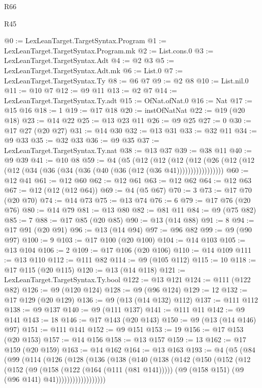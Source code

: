 \begin{lexlean}{R66}
\begin{lexlean}{R45}
\begin{coremodule}
{{{{{{{{{{{{{{{{{{{{{{{{{{{{{{{{{{{{{{{{{{{{{{{{{{{{{{{{{{{{{{{{{{{{{{{{{{{{{{{{{{{{{{{{{{{@0 := LexLeanTarget.TargetSyntax.Program
@1 := LexLeanTarget.TargetSyntax.Program.mk
@2 := List.cons.{0}
@3 := LexLeanTarget.TargetSyntax.Adt
@4 := @2 @3
@5 := LexLeanTarget.TargetSyntax.Adt.mk
@6 := List.{0}
@7 := LexLeanTarget.TargetSyntax.Ty
@8 := @6 @7
@9 := @2 @8
@10 := List.nil.{0}
@11 := @10 @7
@12 := @9 @11
@13 := @2 @7
@14 := LexLeanTarget.TargetSyntax.Ty.adt
@15 := OfNat.ofNat.{0}
@16 := Nat
@17 := @15 @16
@18 := 1
@19 := @17 @18
@20 := instOfNatNat
@22 := @19 (@20 @18)
@23 := @14 @22
@25 := @13 @23 @11
@26 := @9 @25
@27 := 0
@30 := @17 @27 (@20 @27)
@31 := @14 @30
@32 := @13 @31
@33 := @32 @11
@34 := @9 @33
@35 := @32 @33
@36 := @9 @35
@37 := LexLeanTarget.TargetSyntax.Ty.nat
@38 := @13 @37
@39 := @38 @11
@40 := @9 @39
@41 := @10 @8
@59 := @4
    (@5
      (@12
        (@12
          (@12 (@12 (@26 (@12 (@12 (@12 (@34 (@36 (@34 (@36 (@40 (@36 (@12 (@36 @41)))))))))))))))))
@60 := @12 @41
@61 := @12 @60
@62 := @12 @61
@63 := @12 @62
@64 := @12 @63
@67 := @12 (@12 (@12 @64))
@69 := @4 (@5 @67)
@70 := 3
@73 := @17 @70 (@20 @70)
@74 := @14 @73
@75 := @13 @74
@76 := 6
@79 := @17 @76 (@20 @76)
@80 := @14 @79
@81 := @13 @80
@82 := @81 @11
@84 := @9 (@75 @82)
@85 := 7
@88 := @17 @85 (@20 @85)
@90 := @13 (@14 @88)
@91 := 8
@94 := @17 @91 (@20 @91)
@96 := @13 (@14 @94)
@97 := @96 @82
@99 := @9 (@90 @97)
@100 := 9
@103 := @17 @100 (@20 @100)
@104 := @14 @103
@105 := @13 @104
@106 := 2
@109 := @17 @106 (@20 @106)
@110 := @14 @109
@111 := @13 @110
@112 := @111 @82
@114 := @9 (@105 @112)
@115 := 10
@118 := @17 @115 (@20 @115)
@120 := @13 (@14 @118)
@121 := LexLeanTarget.TargetSyntax.Ty.bool
@122 := @13 @121
@124 := @111 (@122 @82)
@126 := @9 (@120 @124)
@128 := @9 (@96 @124)
@129 := 12
@132 := @17 @129 (@20 @129)
@136 := @9 (@13 (@14 @132) @112)
@137 := @111 @112
@138 := @9 @137
@140 := @9 (@111 @137)
@141 := @111 @11
@142 := @9 @141
@143 := 18
@146 := @17 @143 (@20 @143)
@150 := @9 (@13 (@14 @146) @97)
@151 := @111 @141
@152 := @9 @151
@153 := 19
@156 := @17 @153 (@20 @153)
@157 := @14 @156
@158 := @13 @157
@159 := 13
@162 := @17 @159 (@20 @159)
@163 := @14 @162
@164 := @13 @163
@193 := @4
    (@5
      (@84
        (@99
          (@114
            (@126
              (@128
                (@136
                  (@138
                    (@140
                      (@138
                        (@142
                          (@150
                            (@152
                              (@12
                                (@152
                                  (@9
                                    (@158 (@122 (@164 (@111 (@81 @141)))))
                                    (@9 (@158 @151) (@9 (@96 @141) @41))))))))))))))))))
}}}}}}}}}}}}}}}}}}}}}}}}}}}}}}}}}}}}}}}}}}}}}}}}}}}}}}}}}}}}}}}}}}}}}}}}}}}}}}}}}}}}}}}}}}}
\end{coremodule}
\end{lexlean}
\end{lexlean}
